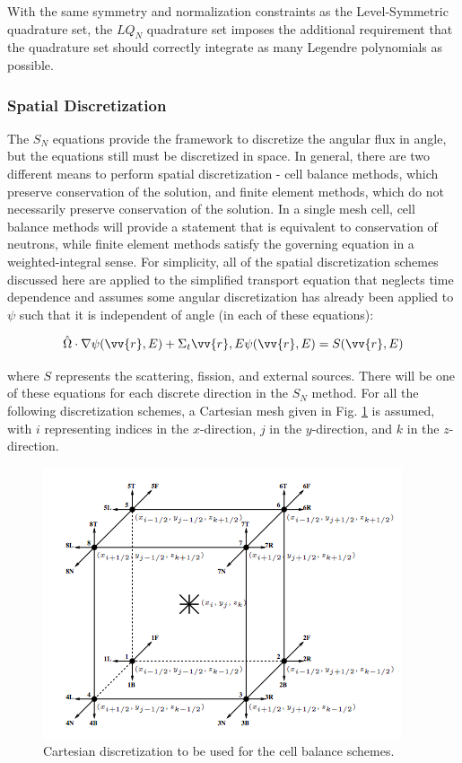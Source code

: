 \documentclass[10pt]{article}
\newcommand{\hO}{\hat{\Omega}}
\newcounter{subsubsubsection}[subsubsection]
\begin{document}
\begin{flushleft}

With the same symmetry and normalization constraints as the Level-Symmetric quadrature set, the \(LQ_N\) quadrature set imposes the additional requirement that the quadrature set should correctly integrate as many Legendre polynomials as possible. 

\subsubsection{Spatial Discretization}

The \(S_N\) equations provide the framework to discretize the angular flux in angle, but the equations still must be discretized in space. In general, there are two different means to perform spatial discretization - cell balance methods, which preserve conservation of the solution, and finite element methods, which do not necessarily preserve conservation of the solution. In a single mesh cell, cell balance methods will provide a statement that is equivalent to conservation of neutrons, while finite element methods satisfy the governing equation in a weighted-integral sense. For simplicity, all of the spatial discretization schemes discussed here are applied to the simplified transport equation that neglects time dependence and assumes some angular discretization has already been applied to \(\psi\) such that it is independent of angle (in each of these equations):

\begin{equation}
\label{eq:SimpleTE}
\hO  \cdot\nabla\psi(\vv{r},E)+\Sigma_t{\vv{r},E}\psi(\vv{r},E)=S(\vv{r},E)
\end{equation}

where \(S\) represents the scattering, fission, and external sources. There will be one of these equations for each discrete direction in the \(S_N\) method. For all the following discretization schemes, a Cartesian mesh given in Fig. \ref{fig:CartesianDiscretization} is assumed, with \(i\) representing indices in the \(x\)-direction, \(j\) in the \(y\)-direction, and \(k\) in the \(z\)-direction.

\begin{figure}[H]
\centering
\includegraphics[width=0.6\linewidth]{figures/CartesianDiscretization.jpg}
\caption{Cartesian discretization to be used for the cell balance schemes.}
\label{fig:CartesianDiscretization}
\end{figure}


\end{flushleft}
\end{document}
